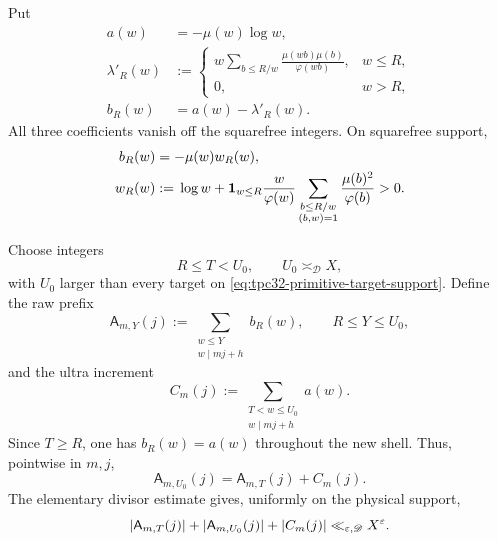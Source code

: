 Put
\begin{align}
 a(w)&=-\mu(w)\log w,
 \label{eq:tpc32-a-coefficient}\\
 \lambda'_R(w)
 &:={}
 \begin{cases}
 \displaystyle
 w\sum_{b\le R/w}\frac{\mu(wb)\mu(b)}{\varphi(wb)},&w\le R,\\[7pt]
 0,&w>R,
 \end{cases}
 \label{eq:tpc32-lambda-coefficient}\\
 b_R(w)&=a(w)-\lambda'_R(w).
 \label{eq:tpc32-b-coefficient}
\end{align}
All three coefficients vanish off the squarefree integers.  On
squarefree support,
\begin{align}
 b_R(w)&=-\mu(w)w_R(w),
 \label{eq:tpc32-positive-coefficient-form}\\
 w_R(w)
 &:={}
 \log w+\mathbf 1_{w\le R}\frac{w}{\varphi(w)}
 \sum_{\substack{b\le R/w\\(b,w)=1}}
 \frac{\mu(b)^2}{\varphi(b)}>0.
 \label{eq:tpc32-wR}
\end{align}

Choose integers
\begin{equation}
 R\le T<U_0,
 \qquad U_0\asymp_{\mathscr D}X,
 \label{eq:tpc32-cutoff-range}
\end{equation}
with \(U_0\) larger than every target on
\eqref{eq:tpc32-primitive-target-support}.  Define the raw prefix
\begin{equation}
 \mathsf A_{m,Y}(j)
 :=\sum_{\substack{w\le Y\\w\mid mj+h}}b_R(w),
 \qquad R\le Y\le U_0,
 \label{eq:tpc32-raw-prefix}
\end{equation}
and the ultra increment
\begin{equation}
 C_m(j)
 :=\sum_{\substack{T<w\le U_0\\w\mid mj+h}}a(w).
 \label{eq:tpc32-ultra-increment}
\end{equation}
Since \(T\ge R\), one has \(b_R(w)=a(w)\) throughout the new shell.
Thus, pointwise in \(m,j\),
\begin{equation}
 \boxed{
 \mathsf A_{m,U_0}(j)
 =\mathsf A_{m,T}(j)+C_m(j).}
 \label{eq:tpc32-exact-prefix-increment}
\end{equation}
The elementary divisor estimate gives, uniformly on the physical
support,
\begin{equation}
 |\mathsf A_{m,T}(j)|+|\mathsf A_{m,U_0}(j)|+|C_m(j)|
 \ll_{\varepsilon,\mathscr D}X^\varepsilon.
 \label{eq:tpc32-prefix-envelope}
\end{equation}

